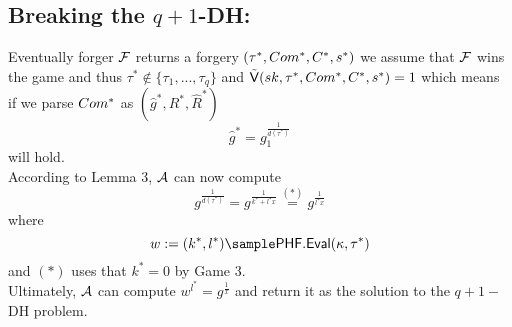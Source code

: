 \subsection*{Breaking the $q+1$-DH:}
Eventually forger $\mathcal{F}$ returns a forgery $(\tau^*,Com^*,C^*,s^*)$ we assume that $\mathcal{F}$ wins the game and thus $\tau^* \notin \{\tau_1,...,\tau_q\}$ and 
$\tilde{\mathsf{V}}(sk, \tau^*,Com^*,C^*,s^*) = 1$ which means if we parse $Com^*$ as $(\hat{g}^*,R^*,\hat{R}^*)$
$$\hat{g}^* = g_1^{\frac{1}{d(\tau^*)}} $$
will hold.
\\
According to Lemma 3, $\mathcal{A}$ can now compute 
$$g^\frac{1}{d(\tau^*)} = g^\frac{1}{k^*+l^*x}  \stackrel{(*)}{=} g^\frac{1}{l^*x}$$
where
$$w:=(k^*,l^*) \sample \phfEval(\kappa, \tau^*)$$
and $(*)$ uses that $k^* = 0$ by Game 3.
\\
Ultimately, $\mathcal{A}$ can compute
$w^{l^*} = g^\frac{1}{x}$ 
and return it as the solution to the $q+1-$DH problem.

